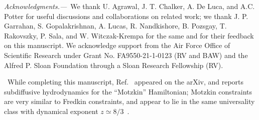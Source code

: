\documentclass[prl,aps,amsfonts,twocolumn,superscriptaddress,notitlepage,floatfix]{revtex4-1}
\begin{document}
\noindent \emph{Acknowledgments.---}\, %
We thank U. Agrawal, J. T. Chalker, A. De Luca, and A.C. Potter for useful discussions and collaborations on related work; we thank J. P. Garrahan, S. Gopalakrishnan, A. Lucas, R. Nandkishore, B. Pozsgay, T. Rakovszky, P. Sala, and W. Witczak-Krempa for the same and for their feedback on this manuscript. We acknowledge support from the Air  Force  Office  of  Scientific  Research  under  Grant No. FA9550-21-1-0123  (RV and BAW) and the Alfred P. Sloan Foundation through a Sloan Research Fellowship (RV).

\, While completing this manuscript, Ref.~ appeared on the arXiv, and reports subdiffusive hydrodynamics for the ``Motzkin'' Hamiltonian; Motzkin constraints are very similar to Fredkin constraints, and appear to lie in the same universality class with dynamical exponent $z\simeq 8/3$~\cite{supp}.







\bigskip

\onecolumngrid
\newpage


\newpage

\newpage

\newpage

\newpage

\newpage

\newpage

\newpage

\newpage

\newpage

\newpage

\newpage

\newpage

\newpage

\newpage

\newpage

\newpage

\newpage

\newpage

\newpage

\newpage

\newpage

\newpage

\newpage

\newpage

\newpage

\end{document}

